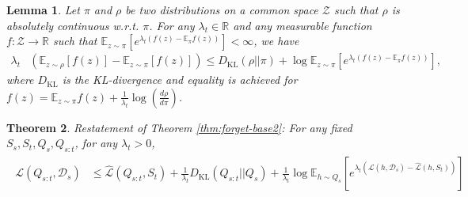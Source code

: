 \documentclass{article}
\theoremstyle{plain}
\newtheorem{theorem}{Theorem}[section]
\newtheorem{lemma}[theorem]{Lemma}
\theoremstyle{definition}
\theoremstyle{remark}
\begin{document}
\begin{lemma} \label{lemma:concentration} \cite{shui2020beyond} Let $\pi$ and $\rho$ be two distributions on a common space $\mathcal{Z}$ such that $\rho$ is absolutely continuous w.\!r.\!t.\! $\pi$. For any $\lambda_t\in \mathbb{R}$ and any measurable function $f:\mathcal{Z}\rightarrow \mathbb{R}$ such that $\mathbb{E}_{z\sim \pi}\left [e^{\lambda_t(f(z)-\mathbb{E}_\pi f(z))} \right ]<\infty$, we have
%
	\begin{equation}
 \begin{split}
	\lambda_t&\left ( \mathbb{E}_{z\sim \rho}\left [f(z) \right ]-\mathbb{E}_{z\sim \pi}\left [f(z) \right ] \right ) \leq 
 D_{\mathrm{KL}}(\rho||\pi)+ \log\mathbb{E}_{z\sim \pi}\left [e^{\lambda_t(f(z)-\mathbb{E}_\pi f(z))} \right ],
 \end{split}
	\end{equation}	
	where $D_{\mathrm{KL}}$ is the KL-divergence and equality is achieved for $f(z)=\mathbb{E}_{z\sim\pi} f(z)+\frac{1}{\lambda_t}\log(\frac{d\rho}{d\pi})$.
\end{lemma}

\begin{theorem} Restatement of Theorem \ref{thm:forget-base2}:
     For any fixed $S_s,S_t,Q_s,Q_{s:t}$, for any $
    \lambda_t>0$,
    \begin{align} 
\begin{split}
\mathcal{L}(Q_{s:t}, \mathcal{D}_s) &\leq \hat{\mathcal{L}}(Q_{s:t}, S_t) + \frac{1}{\lambda_t} D_{\mathrm{KL}}(Q_{s:t}||Q_{s})+\frac{1}{\lambda_t}\log\mathbb{E}_{h\sim Q_{s}}\left [e^{\lambda_t(\mathcal{L}(h,\mathcal{D}_s)-\hat{\mathcal{L}}(h,S_t))} \right ]
\end{split}
\end{align}
\end{theorem}
\end{document}
